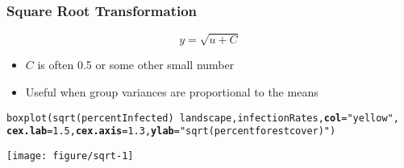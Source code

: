 \documentclass[color=usenames,dvipsnames]{beamer}\usepackage[]{graphicx}\usepackage[]{color}
\makeatletter
\newcommand{\hlnum}[1]{\textcolor[rgb]{0.69,0.494,0}{#1}}%
\newcommand{\hlstr}[1]{\textcolor[rgb]{0.749,0.012,0.012}{#1}}%
\newcommand{\hlopt}[1]{\textcolor[rgb]{0,0,0}{#1}}%
\newcommand{\hlstd}[1]{\textcolor[rgb]{0,0,0}{#1}}%
\newcommand{\hlkwc}[1]{\textcolor[rgb]{0,0,0}{\textbf{#1}}}%
\newcommand{\hlkwd}[1]{\textcolor[rgb]{0.004,0.004,0.506}{#1}}%
\newenvironment{kframe}{%
 \def\at@end@of@kframe{}%
 \ifinner\ifhmode%
  \def\at@end@of@kframe{\end{minipage}}%
  \begin{minipage}{\columnwidth}%
 \fi\fi%
 \def\FrameCommand##1{\hskip\@totalleftmargin \hskip-\fboxsep
 \colorbox{shadecolor}{##1}\hskip-\fboxsep
     \hskip-\linewidth \hskip-\@totalleftmargin \hskip\columnwidth}%
 \MakeFramed {\advance\hsize-\width
   \@totalleftmargin\z@ \linewidth\hsize
   \@setminipage}}%
 {\par\unskip\endMakeFramed%
 \at@end@of@kframe}
\newenvironment{knitrout}{}{} %
\makeatother
\begin{document}
\begin{frame}[fragile]
  \frametitle{Square Root Transformation}
  \[
  y = \sqrt{u + C}
  \]
  \begin{itemize}%
    \small
    \item $C$ is often 0.5 or some other small number
    \item Useful when group variances are proportional to the means
  \end{itemize}
\begin{knitrout}\scriptsize
{}\color{fgcolor}\begin{kframe}
\begin{alltt}
\hlkwd{boxplot}\hlstd{(}\hlkwd{sqrt}\hlstd{(percentInfected)}\hlopt{~}\hlstd{landscape, infectionRates,} \hlkwc{col}\hlstd{=}\hlstr{"yellow"}\hlstd{,}
        \hlkwc{cex.lab}\hlstd{=}\hlnum{1.5}\hlstd{,} \hlkwc{cex.axis}\hlstd{=}\hlnum{1.3}\hlstd{,} \hlkwc{ylab}\hlstd{=}\hlstr{"sqrt(percent forest cover)"}\hlstd{)}
\end{alltt}
\end{kframe}

{\centering \texttt{[image: figure/sqrt-1]} 

}



\end{knitrout}
\end{frame}



\end{document}
